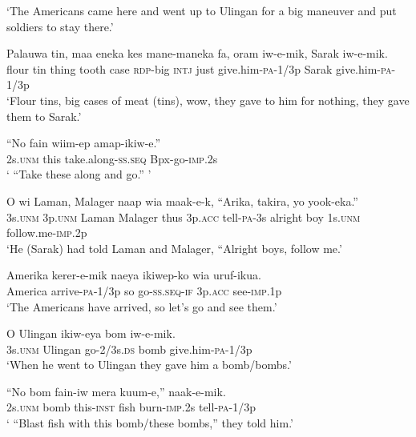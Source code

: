 {\glt ‘The Americans came here and went up to Ulingan for a big maneuver and put soldiers to stay there.’ \\
\z


\ea\label{ex:a:x121}
\gll  Palauwa  tin,  maa  eneka  kes  mane-maneka  fa,     oram  iw-e-mik,  Sarak  iw-e-mik. \\
flour  tin  thing  tooth  case  \textsc{rdp}-big  \textsc{intj}              just  give.him-\textsc{pa}-1/3p  Sarak  give.him-\textsc{pa}-1/3p \\


\glt ‘Flour tins, big cases of meat (tins), wow, they gave to him for nothing, they gave them to Sarak.’ \\
\z


\ea\label{ex:a:x122}
\gll  “No  fain  wiim-ep  amap-ikiw-e.” \\
2s.\textsc{unm}  this  take.along-\textsc{ss.seq}  Bpx-go-\textsc{imp}.2s \\
\glt ‘ “Take these along and go.” ’ \\
\z


\ea\label{ex:a:x123}
\gll  O  wi  Laman,  Malager  naap  wia  maak-e-k,        “Arika,  takira,  yo  yook-eka.” \\
3s.\textsc{unm}  3p.\textsc{unm}  Laman  Malager  thus  3p.\textsc{acc}  tell-\textsc{pa}-3s  alright  boy  1s.\textsc{unm}  follow.me-\textsc{imp}.2p \\


\glt ‘He (Sarak) had told Laman and Malager, “Alright boys, follow me.’ \\
\z


\ea\label{ex:a:x124}
\gll  Amerika  kerer-e-mik  naeya  ikiwep-ko  wia  uruf-ikua. \\
America  arrive-\textsc{pa}-1/3p  so  go-\textsc{ss.seq}-\textsc{if}  3p.\textsc{acc}  see-\textsc{imp}.1p \\
\glt ‘The Americans have arrived, so let’s go and see them.’ \\
\z


\ea\label{ex:a:x125}
\gll  O  Ulingan  ikiw-eya  bom  iw-e-mik. \\
3s.\textsc{unm}  Ulingan  go-2/3s.\textsc{ds}  bomb  give.him-\textsc{pa}-1/3p \\
\glt ‘When he went to Ulingan they gave him a bomb/bombs.’ \\
\z


\ea\label{ex:a:x126}
\gll  “No  bom  fain-iw  mera  kuum-e,”  naak-e-mik. \\
2s.\textsc{unm}  bomb  this-\textsc{inst}  fish  burn-\textsc{imp}.2s  tell-\textsc{pa}-1/3p \\
\glt ‘ “Blast fish with this bomb/these bombs,” they told him.’ \\
\z


}
